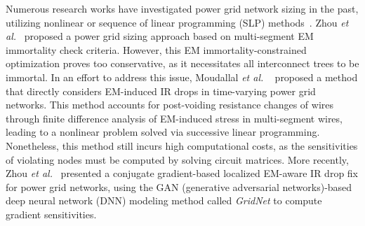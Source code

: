 Numerous research works have investigated power grid network sizing in the past, utilizing nonlinear or sequence of linear programming (SLP) methods~\cite{ChBr:TCAD'88,DuMa:DAC'89,Tan:DAC'99,Wang:TCAD'05,ZhouSun:TVLSI'19, Sukharev:2019pg,ZhouYu:ASPDAC'20,ZhouJin:ICCAD'20}. Zhou {\it et al.}~\cite{ZhouSun:TVLSI'19,ZhouChen:Integration'21} proposed a power grid sizing approach based on multi-segment EM immortality check criteria. However, this EM immortality-constrained optimization proves too conservative, as it necessitates all interconnect trees to be immortal. In an effort to address this issue, Moudallal {\it et al.}
~\cite{Sukharev:2019pg} proposed a method that directly considers EM-induced IR drops in time-varying power grid networks. This method accounts for post-voiding resistance changes of wires through finite difference analysis of EM-induced stress in multi-segment wires, leading to a nonlinear problem solved via successive linear programming. Nonetheless, this method still incurs high computational costs, as the sensitivities of violating nodes must be computed by solving circuit matrices. More recently, Zhou {\it et al.}~\cite{ZhouJin:ICCAD'20, HanLiu:TCAD'22-23} presented a conjugate gradient-based localized EM-aware IR drop fix for power grid networks, using the GAN (generative adversarial networks)-based deep neural network (DNN) modeling method called {\it GridNet} to compute gradient sensitivities.


